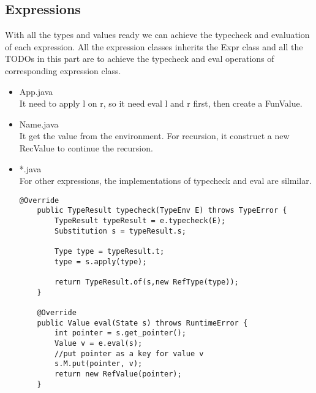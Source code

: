 \documentclass[paper=a4, fontsize=11pt]{scrartcl}
\begin{document}
\subsection{Expressions}
With all the types and values ready we can achieve the typecheck and evaluation of each expression. All the expression classes inherits the Expr class and all the TODOs in this part are to achieve the typecheck and eval operations of corresponding expression class.

\begin{itemize}
\item App.java \\
It need to apply l on r, so it need eval l and r first, then create a FunValue.
\item Name.java \\
It get the value from the environment. For recursion, it construct a new RecValue to continue the recursion. 
\item *.java \\
For other expressions, the implementations of typecheck and eval are silmilar.
\begin{lstlisting}[title=Ref.java, frame=shadowbox]
    @Override
    public TypeResult typecheck(TypeEnv E) throws TypeError {
        TypeResult typeResult = e.typecheck(E);
        Substitution s = typeResult.s;

        Type type = typeResult.t;
        type = s.apply(type);

        return TypeResult.of(s,new RefType(type));
    }

    @Override
    public Value eval(State s) throws RuntimeError {
        int pointer = s.get_pointer();
        Value v = e.eval(s);
        //put pointer as a key for value v
        s.M.put(pointer, v);
        return new RefValue(pointer);
    }
\end{lstlisting}
\end{itemize}



\end{document}
